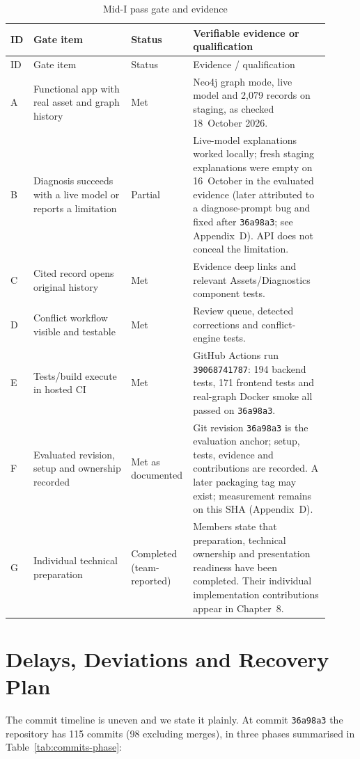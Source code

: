 \begin{longtable}{@{}p{0.05\linewidth}p{0.30\linewidth}p{0.14\linewidth}p{0.42\linewidth}@{}}
\caption{Mid-I pass gate and evidence}\label{tab:mid-pass-gate}\\
\toprule
ID & Gate item & Status & Verifiable evidence or qualification \\
\midrule
\endfirsthead
\toprule
ID & Gate item & Status & Evidence / qualification \\
\midrule
\endhead
A & Functional app with real asset and graph history & Met & Neo4j graph mode, live model and 2{,}079 records on staging, as checked 18~October 2026. \\
B & Diagnosis succeeds with a live model or reports a limitation & Partial & Live-model explanations worked locally; fresh staging explanations were empty on 16~October in the evaluated evidence (later attributed to a diagnose-prompt bug and fixed after \texttt{36a98a3}; see Appendix~D). API does not conceal the limitation. \\
C & Cited record opens original history & Met & Evidence deep links and relevant Assets/Diagnostics component tests. \\
D & Conflict workflow visible and testable & Met & Review queue, detected corrections and conflict-engine tests. \\
E & Tests/build execute in hosted CI & Met & GitHub Actions run \texttt{39068741787}: 194 backend tests, 171 frontend tests and real-graph Docker smoke all passed on \texttt{36a98a3}. \\
F & Evaluated revision, setup and ownership recorded & Met as documented & Git revision \texttt{36a98a3} is the evaluation anchor; setup, tests, evidence and contributions are recorded. A later packaging tag may exist; measurement remains on this SHA (Appendix~D). \\
G & Individual technical preparation & Completed (team-reported) & Members state that preparation, technical ownership and presentation readiness have been completed. Their individual implementation contributions appear in Chapter~8. \\
\bottomrule
\end{longtable}

\section{Delays, Deviations and Recovery Plan}

The commit timeline is uneven and we state it plainly. At commit \texttt{36a98a3} the repository has 115 commits (98 excluding merges), in three phases summarised in Table~\ref{tab:commits-phase}:


